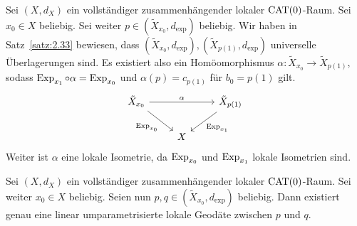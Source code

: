 \begin{bemerkung}
\label{bem:2.37}
	Sei $(X,d_X)$ ein vollständiger zusammenhängender lokaler $\operatorname{CAT(0)}$-Raum.
	Sei $x_0 \in X$ beliebig.
	Sei weiter $p \in (\tilde{X}_{x_0},d_{\exp})$ beliebig.
	Wir haben in Satz~\ref{satz:2.33} bewiesen, dass $(\tilde{X}_{x_0},d_{\exp}), (\tilde{X}_{p(1)},d_{\exp})$ universelle Überlagerungen sind.
	Es existiert also ein Homöomorphismus $\alpha \colon \tilde{X}_{x_0} \rightarrow \tilde{X}_{p(1)}$, sodass $\operatorname{Exp}_{x_1} \circ \alpha = \operatorname{Exp}_{x_0}$ und $\alpha(p) = c_{p(1)}$ für $b_0 = p(1)$ gilt.
	\[
		\begin{tikzcd}
			\tilde{X}_{x_0} \arrow{rr}{\alpha} \arrow{rd}[swap]{\Exp_{x_0}} & & \tilde{X}_{p(1)} \arrow{ld}{\Exp_{x_1}} \\
			& X & 
		\end{tikzcd}
	\]	
	Weiter ist $\alpha$ eine lokale Isometrie, da $\operatorname{Exp}_{x_0}$ und $\operatorname{Exp}_{x_1}$ lokale Isometrien sind.
\end{bemerkung}

\begin{lemma}
\label{lemma:2.38}
	Sei $(X,d_X)$ ein vollständiger zusammenhängender lokaler $\operatorname{CAT(0)}$-Raum.
	Sei weiter $x_0 \in X$ beliebig.
	Seien nun $p,q \in (\tilde{X}_{x_0},d_{\exp})$ beliebig.
	Dann existiert genau eine linear umparametrisierte lokale Geodäte zwischen $p$ und $q$.
\end{lemma}

